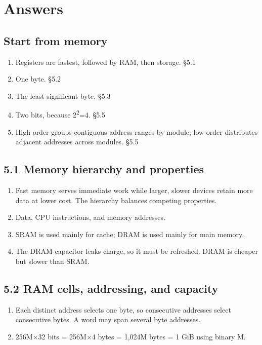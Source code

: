 \documentclass[11pt]{article}
\begin{document}
\section{Answers}
\begin{keepsection}\subsection{Start from memory}

\begin{enumerate}
\item Registers are fastest, followed by RAM, then storage. \hfill{\small\color{FAUblue}§5.1}
\item One byte. \hfill{\small\color{FAUblue}§5.2}
\item The least significant byte. \hfill{\small\color{FAUblue}§5.3}
\item Two bits, because 2\textsuperscript{2}=4. \hfill{\small\color{FAUblue}§5.5}
\item High-order groups contiguous address ranges by module; low-order distributes adjacent addresses across modules. \hfill{\small\color{FAUblue}§5.5}
\end{enumerate}

\end{keepsection}
\begin{keepsection}\subsection{5.1 Memory hierarchy and properties}

\begin{enumerate}
\item Fast memory serves immediate work while larger, slower devices retain more data at lower cost. The hierarchy balances competing properties.
\item Data, CPU instructions, and memory addresses.
\item SRAM is used mainly for cache; DRAM is used mainly for main memory.
\item The DRAM capacitor leaks charge, so it must be refreshed. DRAM is cheaper but slower than SRAM.
\end{enumerate}

\end{keepsection}
\begin{keepsection}\subsection{5.2 RAM cells, addressing, and capacity}

\begin{enumerate}
\item Each distinct address selects one byte, so consecutive addresses select consecutive bytes. A word may span several byte addresses.
\item 256M\ensuremath{\times}32 bits = 256M\ensuremath{\times}4 bytes = 1,024M bytes = 1 GiB using binary M.
\end{enumerate}

\end{keepsection}
\end{document}
